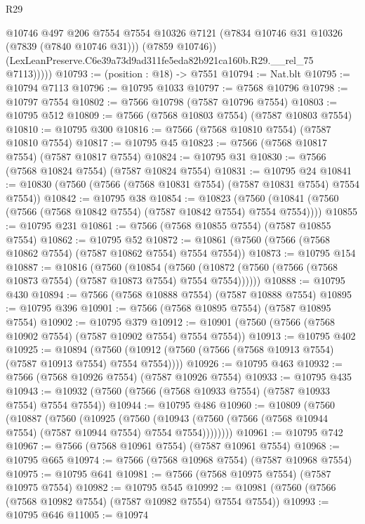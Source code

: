 \begin{lexlean}{R29}
\begin{coremodule}
              @10746
              @497
              @206
              @7554
              @7554
              @10326
              @7121
              (@7834 @10746 @31 @10326 (@7839 (@7840 @10746 @31)))
              (@7859 @10746))
            (LexLeanPreserve.C6e39a73d9ad311fe5eda82b921ca160b.R29.__rel_75 @7113)))))
@10793 := (position : @18) -> @7551
@10794 := Nat.blt
@10795 := @10794 @7113
@10796 := @10795 @1033
@10797 := @7568 @10796
@10798 := @10797 @7554
@10802 := @7566 @10798 (@7587 @10796 @7554)
@10803 := @10795 @512
@10809 := @7566 (@7568 @10803 @7554) (@7587 @10803 @7554)
@10810 := @10795 @300
@10816 := @7566 (@7568 @10810 @7554) (@7587 @10810 @7554)
@10817 := @10795 @45
@10823 := @7566 (@7568 @10817 @7554) (@7587 @10817 @7554)
@10824 := @10795 @31
@10830 := @7566 (@7568 @10824 @7554) (@7587 @10824 @7554)
@10831 := @10795 @24
@10841 := @10830 (@7560 (@7566 (@7568 @10831 @7554) (@7587 @10831 @7554) @7554 @7554))
@10842 := @10795 @38
@10854 := @10823
    (@7560 (@10841 (@7560 (@7566 (@7568 @10842 @7554) (@7587 @10842 @7554) @7554 @7554))))
@10855 := @10795 @231
@10861 := @7566 (@7568 @10855 @7554) (@7587 @10855 @7554)
@10862 := @10795 @52
@10872 := @10861 (@7560 (@7566 (@7568 @10862 @7554) (@7587 @10862 @7554) @7554 @7554))
@10873 := @10795 @154
@10887 := @10816
    (@7560
      (@10854
        (@7560 (@10872 (@7560 (@7566 (@7568 @10873 @7554) (@7587 @10873 @7554) @7554 @7554))))))
@10888 := @10795 @430
@10894 := @7566 (@7568 @10888 @7554) (@7587 @10888 @7554)
@10895 := @10795 @396
@10901 := @7566 (@7568 @10895 @7554) (@7587 @10895 @7554)
@10902 := @10795 @379
@10912 := @10901 (@7560 (@7566 (@7568 @10902 @7554) (@7587 @10902 @7554) @7554 @7554))
@10913 := @10795 @402
@10925 := @10894
    (@7560 (@10912 (@7560 (@7566 (@7568 @10913 @7554) (@7587 @10913 @7554) @7554 @7554))))
@10926 := @10795 @463
@10932 := @7566 (@7568 @10926 @7554) (@7587 @10926 @7554)
@10933 := @10795 @435
@10943 := @10932 (@7560 (@7566 (@7568 @10933 @7554) (@7587 @10933 @7554) @7554 @7554))
@10944 := @10795 @486
@10960 := @10809
    (@7560
      (@10887
        (@7560
          (@10925
            (@7560
              (@10943 (@7560 (@7566 (@7568 @10944 @7554) (@7587 @10944 @7554) @7554 @7554))))))))
@10961 := @10795 @742
@10967 := @7566 (@7568 @10961 @7554) (@7587 @10961 @7554)
@10968 := @10795 @665
@10974 := @7566 (@7568 @10968 @7554) (@7587 @10968 @7554)
@10975 := @10795 @641
@10981 := @7566 (@7568 @10975 @7554) (@7587 @10975 @7554)
@10982 := @10795 @545
@10992 := @10981 (@7560 (@7566 (@7568 @10982 @7554) (@7587 @10982 @7554) @7554 @7554))
@10993 := @10795 @646
@11005 := @10974

\end{coremodule}
\end{lexlean}
